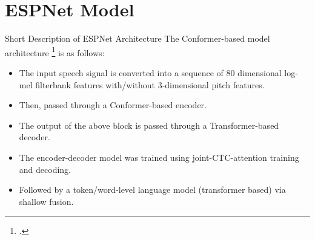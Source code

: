 \documentclass[10pt]{beamer}
\begin{document}
\section{ESPNet Model}
\begin{frame}{Short Description of ESPNet Architecture }
The Conformer-based model architecture \footcite{espnet} is as follows:
\begin{itemize}
	\item The input speech signal is converted into a sequence of 80 dimensional log-mel filterbank features with/without 3-dimensional pitch features.
	\item Then, passed through a Conformer-based encoder.
	\item The output of the above block is passed through a Transformer-based decoder.
	\item The encoder-decoder model was trained using joint-CTC-attention training and decoding.
	\item Followed by a token/word-level language model (transformer based) via shallow fusion.
\end{itemize}
\end{frame}
\end{document}
